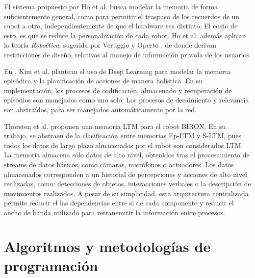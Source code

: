 El sistema propuesto por Ho et al. \cite{Ho2009} busca modelar la memoria de forma suficientemente general, como para permitir el traspaso de los recuerdos de un robot a otro, independientemente de que el hardware sea distinto; El costo de esto, es que se reduce la personalización de cada robot. Ho et al. además aplican la teoría \textit{Roboética}, sugerida por Veruggio y Operto \cite{Veruggio2006}, de donde derivan restricciones de diseño, relativas al manejo de información privada de los usuarios.

En \cite{KimMinJoo2016}, Kim et al. plantean el uso de Deep Learning para modelar la memoria episódica y la planificación de acciones de manera holística. En su implementación, los procesos de codificación, almacenado y recuperación de episodios son manejados como uno solo. Los procesos de decaimiento y relevancia son abstraídos, para ser manejados automáticamente por la red.

Thorsten et al. \cite{Spexard2008} proponen una memoria LTM para el robot BIRON. En su trabajo, se abstraen de la clasificación entre memorias Ep-LTM y S-LTM, pues todos los datos de largo plazo almacenados por el robot son considerados LTM. La memoria almacena sólo datos de alto nivel, obtenidos tras el procesamiento de streams de datos básicos, como cámaras, micrófonos o actuadores. Los datos almacenados corresponden a un historial de percepciones y acciones de alto nivel realizadas, como: detecciones de objetos, interacciones verbales o la descripción de movimientos realizados. A pesar de su simplicidad, esta arquitectura centralizada permite reducir el las dependencias entre si de cada componente y reducir el ancho de banda utilizado para retransmitir la información entre procesos.







\section{Algoritmos y metodologías de programación}


